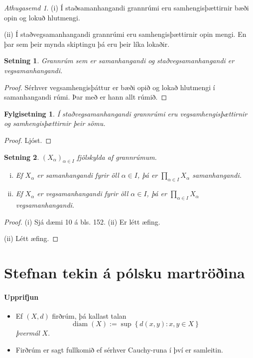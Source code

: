 \documentclass[a4paper,icelandic]{book}
\theoremstyle{definition}
\theoremstyle{plain}
\newtheorem{setn}{Setning}[section]
\newtheorem{fylgisetn}{Fylgisetning}[section]
\theoremstyle{remark}
\newtheorem*{ath}{Athugasemd}
\DeclareMathOperator{\diam}{diam} %
\begin{document}
\begin{ath}
  (i) Í staðsamanhangandi grannrúmi eru samhengisþættirnir bæði opin og lokuð
  hlutmengi.

  (ii) Í staðvegsamanhangandi grannrúmi eru samhengisþættirnir opin mengi. En
  þar sem þeir mynda skiptingu þá eru þeir líka lokaðir.
\end{ath}
\begin{setn}
  Grannrúm sem er samanhangandi og staðvegsamanhangandi er vegsamanhangandi.
\end{setn}
\begin{proof}
  Sérhver vegsamhengisþáttur er bæði opið og lokað hlutmengi í samanhangandi
  rúmi. Þar með er hann allt rúmið.
\end{proof}
\begin{fylgisetn}
  Í staðvegsamanhangandi grannrúmi eru vegsamhengisþættirnir og
  samhengisþættirnir þeir sömu.
\end{fylgisetn}
\begin{proof}
  Ljóst.
\end{proof}
\begin{setn}
  $(X_\alpha)_{\alpha\in I}$ fjölskylda af grannrúmum.
  \begin{enumerate}[(i)]
    \item Ef $X_\alpha$ er samanhangandi fyrir öll $\alpha\in I$, þá er
      $\prod_{\alpha\in I} X_\alpha$ samanhangandi.
    \item Ef $X_\alpha$ er vegsamanhangandi fyrir öll $\alpha\in I$, þá er
      $\prod_{\alpha\in I} X_\alpha$ vegsamanhangandi.
  \end{enumerate}
\end{setn}
\begin{proof}
  (i) Sjá dæmi 10 á bls. 152. (ii) Er létt æfing.

  (ii) Létt æfing.
\end{proof}

\section{Stefnan tekin á pólsku martröðina}

\paragraph{Upprifjun} 
\begin{itemize}
  \item Ef $(X,d)$ firðrúm, þá kallast talan \[
    \diam(X) := \sup\left\{ d(x,y) : x,y\in X \right\} \]
    \emph{þvermál} $X$.
  \item Firðrúm er sagt fullkomið ef sérhver Cauchy-runa í því er samleitin.
\end{itemize}
\end{document}
